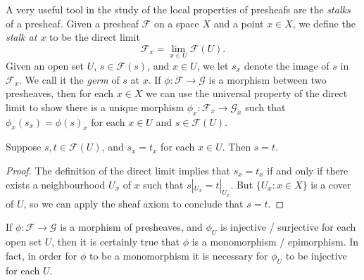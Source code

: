 A very useful tool in the study of the local properties of presheafs are the \emph{stalks} of a presheaf. Given a presheaf $\mathcal{F}$ on a space $X$ and a point $x \in X$, we define the \emph{stalk at $x$} to be the direct limit
%
\[ \mathcal{F}_x = \lim_{x \in U} \mathcal{F}(U). \]
%
Given an open set $U$, $s \in \mathcal{F}(s)$, and $x \in U$, we let $s_x$ denote the image of $s$ in $\mathcal{F}_x$. We call it the \emph{germ} of $s$ at $x$. If $\phi: \mathcal{F} \to \mathcal{G}$ is a morphism between two presheaves, then for each $x \in X$ we can use the universal property of the direct limit to show there is a unique morphism $\phi_x: \mathcal{F}_x \to \mathcal{G}_x$ such that $\phi_x(s_x) = \phi(s)_x$ for each $x \in U$ and $s \in \mathcal{F}(U)$.

\begin{lemma}
    Suppose $s,t \in \mathcal{F}(U)$, and $s_x = t_x$ for each $x \in U$. Then $s = t$.
\end{lemma}
\begin{proof}
    The definition of the direct limit implies that $s_x = t_x$ if and only if there exists a neighbourhood $U_x$ of $x$ such that $s|_{U_x} = t|_{U_x}$. But $\{ U_x : x \in X \}$ is a cover of $U$, so we can apply the sheaf axiom to conclude that $s = t$.
\end{proof}

If $\phi: \mathcal{F} \to \mathcal{G}$ is a morphism of presheaves, and $\phi_U$ is injective / surjective for each open set $U$, then it is certainly true that $\phi$ is a monomorphism / epimorphism. In fact, in order for $\phi$ to be a monomorphism it is necessary for $\phi_U$ to be injective for each $U$.

